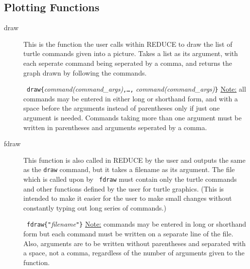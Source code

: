 \subsection{Plotting Functions}
\begin{description}
 \item[draw] This is the function the user calls within {\small REDUCE} to
       draw the list of turtle commands given into a picture. Takes a list
       as its argument, with each seperate command being seperated by a
       comma, and returns the graph drawn by following the commands.

       \syntax\ {\tt draw\{}{\it command(command\_args)}{\tt ,\ldots,}      
                              {\it command(command\_args)}{\tt \}}
       \underline{Note:} all commands may be entered in either long or
                         shorthand form, and with a space
                         before the arguments instead of parentheses only
                         if just one argument is needed. Commands taking
                         more than one argument must be written in
                         parentheses and arguments seperated by a comma.
 \item[fdraw] This function is also called in {\small REDUCE} by the user 
       and outputs the same as the {\tt draw} command, but it takes a
       filename as its argument. The file which is called upon by {\tt
       fdraw} must contain only the turtle commands and other functions
       defined by the user for turtle graphics. (This is intended to make
       it easier for the user to make small changes without constantly
       typing out long series of commands.)

       \syntax\ {\tt fdraw\{"}{\it filename}{\tt "\}}
       \underline{Note:} commands may be entered in long or shorthand form
                         but each command must be written on a separate
                         line of the file. Also, arguments are to be
                         written without parentheses and separated with a
                         space, not a comma, regardless of the number of
                         arguments given to the function.
\end{description}

